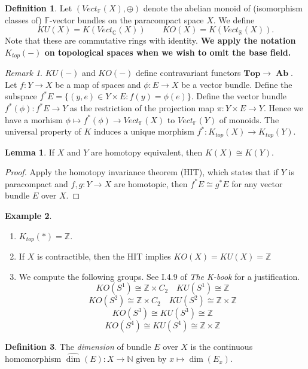 \documentclass[10pt,letterpaper,cm]{nupset}
\theoremstyle{definition}
\newtheorem{definition}{Definition}
\newtheorem{exmp}[definition]{Example}
\theoremstyle{theorem}
\newtheorem{lemma}[theorem]{Lemma}
\theoremstyle{remark}
\newtheorem{remark}{Remark}
\newcommand{\C}{\mathbb C}
\newcommand{\F}{\mathbb F}
\newcommand{\N}{\mathbb N}
\newcommand{\R}{\mathbb R}
\newcommand{\Z}{\mathbb Z}
\newcommand{\1}{\mathbf{1}}
\newcommand{\0}{\vec 0}
\DeclareMathOperator{\Ab}{\mathbf{Ab}}
\begin{document}
\begin{definition}
Let $(Vect_{\F}(X), \oplus)$ denote the abelian monoid of (isomorphism classes of) $\F$-vector bundles on the paracompact space $X$. We define $$KU(X) = K(Vect_{\C}(X)) \quad \quad KO(X) = K(Vect_{\R}(X)).$$ Note that these are commutative rings with identity. \textbf{We apply the notation $K_{top}(-)$ on topological spaces when we wish to omit the base field.}
\end{definition}

\begin{remark}
$KU(-)$ and $KO(-)$ define contravariant functors $\mathbf{Top} \to \Ab$. Let $f: Y \to X$ be a map of spaces and $\phi : E \to X$ be a vector bundle. Define the subspace $f^{\ast}E = \{(y, e) \in Y \times E : f(y) = \phi(e)\}$.  Define the vector bundle $f^{\ast}(\phi) : f^{\ast}E \to Y$ as the restriction of the projection map $\pi : Y \times E \to Y$. Hence we have a morhism $\phi \mapsto f^{\ast}(\phi) \to Vect_{\F}(X)$ to $Vect_{\F}(Y)$ of monoids. The universal property of $K$ induces a unique morphism $f^{\ast}: K_{top}(X) \to K_{top}(Y)$.
\end{remark}

\begin{lemma}
If $X$ and $Y$ are homotopy equivalent, then $K(X) \cong K(Y)$.
\end{lemma}
\begin{proof}
Apply the homotopy invariance theorem (HIT), which states that if $Y$ is paracompact and $f, g: Y \to X$ are homotopic, then $f^{\ast}E \cong g^{\ast}E$ for any vector bundle $E$ over $X$.
\end{proof}

\begin{exmp} $ $
\begin{enumerate}
\item $K_{top}(\ast) = \Z$.
\item If $X$ is contractible, then the HIT implies $KO(X) = KU(X) = \Z$
\item We compute the following groups. See I.4.9 of \textit{The K-book} for a justification.
$$KO(S^1) \cong \Z \times C_2 \quad KU(S^1) \cong \Z$$ $$KO(S^2) \cong \Z \times C_2   \quad KU(S^2) \cong \Z \times \Z$$  $$KO(S^3) \cong KU(S^3) \cong \Z $$   $$ KO(S^4) \cong KU(S^4) \cong \Z \times \Z$$
\end{enumerate}
\end{exmp}


\begin{definition}
The \textit{dimension} of bundle $E$ over $X$ is the continuous homomorphism $\widehat{\dim}(E) : X \to \N$ given by $x \mapsto \dim(E_x)$.
\end{definition}
\end{document}
